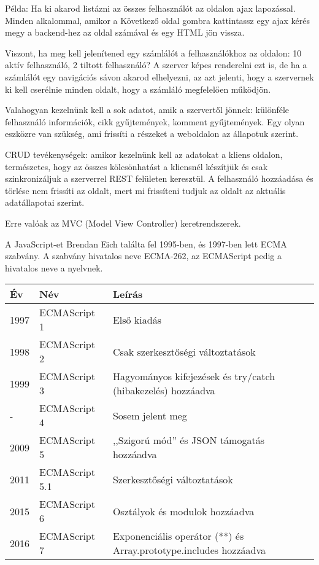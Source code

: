 Példa: Ha ki akarod listázni az összes felhasználót az oldalon ajax lapozással. Minden alkalommal, amikor a Következő oldal gombra kattintassz egy ajax kérés megy a backend-hez az oldal számával és egy HTML jön vissza.

Viszont, ha meg kell jelenítened egy számlálót a felhasználókhoz az oldalon: 10 aktív felhasználó, 2 tiltott felhasználó? A szerver képes renderelni ezt is, de ha a számlálót egy navigációs sávon akarod elhelyezni, az azt jelenti, hogy a szervernek ki kell cserélnie minden oldalt, hogy a számláló megfelelően működjön.

Valahogyan kezelnünk kell a sok adatot, amik a szervertől jönnek: különféle felhasználó információk, cikk gyűjtemények, komment gyűjtemények. Egy olyan eszközre van szükség, ami frissíti a részeket a weboldalon az állapotuk szerint.

CRUD tevékenységek: amikor kezelnünk kell az adatokat a kliens oldalon, természetes, hogy az összes kölcsönhatást a kliensnél készítjük és csak szinkronizáljuk a szerverrel REST felületen keresztül. A felhasználó hozzáadása és törlése nem frissíti az oldalt, mert mi frissíteni tudjuk az oldalt az aktuális adatállapotai szerint.

Erre valóak az MVC (Model View Controller) keretrendszerek.


A JavaScript-et Brendan Eich találta fel 1995-ben, és 1997-ben lett ECMA szabvány.
A szabvány hivatalos neve ECMA-262, az ECMAScript pedig a hivatalos neve a nyelvnek.

\begin{tabular}{|l|l|p{8cm}|}
\hline
\textbf{Év} & \textbf{Név} & \textbf{Leírás} \\
\hline
1997 & ECMAScript 1 & Első kiadás \\
\hline
1998 & ECMAScript 2 & Csak szerkesztőségi változtatások \\
\hline
1999 & ECMAScript 3 & Hagyományos kifejezések és try/catch (hibakezelés) hozzáadva \\
\hline
- & ECMAScript 4 & Sosem jelent meg \\
\hline
2009 & ECMAScript 5 & ,,Szigorú mód'' és JSON támogatás hozzáadva \\
\hline
2011 & ECMAScript 5.1 & Szerkesztőségi változtatások \\
\hline
2015 & ECMAScript 6 & Osztályok és modulok hozzáadva \\
\hline
2016 & ECMAScript 7 & Exponenciális operátor (**) és Array.prototype.includes hozzáadva \\
\hline
\end{tabular}
\\

